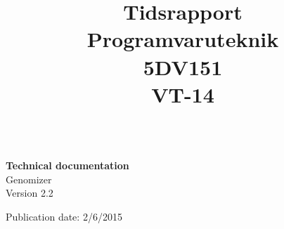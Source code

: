 \title{Tidsrapport \\ 
	Programvaruteknik \\5DV151\\
	VT-14 }
	\begin{titlepage}
		\thispagestyle{empty}
		\begin{large}
			\begin{tabular}{@{}p{\textwidth}@{}}
			\end{tabular}
		\end{large}
		\vspace{35mm}
		\begin{center}
			\Huge{\textbf{Technical documentation}\\ Genomizer} \\
			\vspace{10mm}
			\LARGE{Version 2.2} \\
           \vspace{5mm}
           
            Publication date: 2/6/2015 \\
            

			\vspace{70mm}
            
			\begin{normalsize}				
			\end{normalsize}
		\end{center}
	\end{titlepage}
